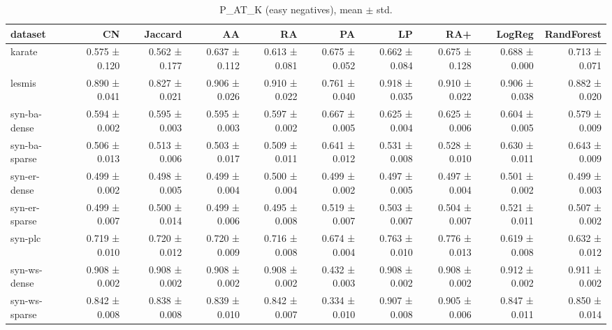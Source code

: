 \begin{table}[t]
\centering
\caption{P_AT_K (easy negatives), mean $\pm$ std.}
\label{tab:main_p_at_k_easy}
\begin{tabular}{lrrrrrrrrr}
\hline
dataset & CN & Jaccard & AA & RA & PA & LP & RA+ & LogReg & RandForest \\
\hline
karate & 0.575 ± 0.120 & 0.562 ± 0.177 & 0.637 ± 0.112 & 0.613 ± 0.081 & 0.675 ± 0.052 & 0.662 ± 0.084 & 0.675 ± 0.128 & 0.688 ± 0.000 & 0.713 ± 0.071 \\
lesmis & 0.890 ± 0.041 & 0.827 ± 0.021 & 0.906 ± 0.026 & 0.910 ± 0.022 & 0.761 ± 0.040 & 0.918 ± 0.035 & 0.910 ± 0.022 & 0.906 ± 0.038 & 0.882 ± 0.020 \\
syn-ba-dense & 0.594 ± 0.002 & 0.595 ± 0.003 & 0.595 ± 0.003 & 0.597 ± 0.002 & 0.667 ± 0.005 & 0.625 ± 0.004 & 0.625 ± 0.006 & 0.604 ± 0.005 & 0.579 ± 0.009 \\
syn-ba-sparse & 0.506 ± 0.013 & 0.513 ± 0.006 & 0.503 ± 0.017 & 0.509 ± 0.011 & 0.641 ± 0.012 & 0.531 ± 0.008 & 0.528 ± 0.010 & 0.630 ± 0.011 & 0.643 ± 0.009 \\
syn-er-dense & 0.499 ± 0.002 & 0.498 ± 0.005 & 0.499 ± 0.004 & 0.500 ± 0.004 & 0.499 ± 0.002 & 0.497 ± 0.005 & 0.497 ± 0.004 & 0.501 ± 0.002 & 0.499 ± 0.003 \\
syn-er-sparse & 0.499 ± 0.007 & 0.500 ± 0.014 & 0.499 ± 0.006 & 0.495 ± 0.008 & 0.519 ± 0.007 & 0.503 ± 0.007 & 0.504 ± 0.007 & 0.521 ± 0.011 & 0.507 ± 0.002 \\
syn-plc & 0.719 ± 0.010 & 0.720 ± 0.012 & 0.720 ± 0.009 & 0.716 ± 0.008 & 0.674 ± 0.004 & 0.763 ± 0.010 & 0.776 ± 0.013 & 0.619 ± 0.008 & 0.632 ± 0.012 \\
syn-ws-dense & 0.908 ± 0.002 & 0.908 ± 0.002 & 0.908 ± 0.002 & 0.908 ± 0.002 & 0.432 ± 0.003 & 0.908 ± 0.002 & 0.908 ± 0.002 & 0.912 ± 0.002 & 0.911 ± 0.002 \\
syn-ws-sparse & 0.842 ± 0.008 & 0.838 ± 0.008 & 0.839 ± 0.010 & 0.842 ± 0.007 & 0.334 ± 0.010 & 0.907 ± 0.008 & 0.905 ± 0.006 & 0.847 ± 0.011 & 0.850 ± 0.014 \\
\hline
\end{tabular}
\end{table}